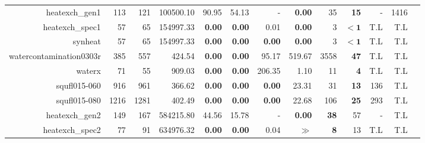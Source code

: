 \begin{landscape}
\begin{table*}[t]
\begin{tabular}{|r|r|r||r||r|r|r|r||r|r|r|r|r|}
                      heatexch\_gen1 &           113 &           121 &                         100500.10 &          90.95 &          54.13 &              - &  \textbf{0.00} &                 35 &        \textbf{15} &                  - &               1416 \\ 
                     heatexch\_spec1 &            57 &            65 &                         154997.33 &  \textbf{0.00} &  \textbf{0.00} &           0.01 &  \textbf{0.00} &                  3 &         $\bm{< 1}$ &                T.L &                T.L \\ 
                             synheat &            57 &            65 &                         154997.33 &  \textbf{0.00} &  \textbf{0.00} &  \textbf{0.00} &  \textbf{0.00} &                  3 &         $\bm{< 1}$ &                T.L &                T.L \\ 
             watercontamination0303r &           385 &           557 &                            424.54 &  \textbf{0.00} &  \textbf{0.00} &          95.17 &         519.67 &               3558 &        \textbf{47} &                T.L &                T.L \\ 
                              waterx &            71 &            55 &                            909.03 &  \textbf{0.00} &  \textbf{0.00} &         206.35 &           1.10 &                 11 &         \textbf{4} &                T.L &                T.L \\ 
                        squfl015-060 &           916 &           961 &                            366.62 &  \textbf{0.00} &  \textbf{0.00} &  \textbf{0.00} &          23.31 &                 31 &        \textbf{13} &                136 &                T.L \\ 
                        squfl015-080 &          1216 &          1281 &                            402.49 &  \textbf{0.00} &  \textbf{0.00} &  \textbf{0.00} &          22.68 &                106 &        \textbf{25} &                293 &                T.L \\ 
                      heatexch\_gen2 &           149 &           167 &                         584215.80 &          44.56 &          15.78 &              - &  \textbf{0.00} &        \textbf{38} &                 57 &                  - &                T.L \\ 
                     heatexch\_spec2 &            77 &            91 &                         634976.32 &  \textbf{0.00} &  \textbf{0.00} &           0.04 &          $\gg$ &         \textbf{8} &                 13 &                T.L &                T.L \\ 

\end{tabular}
\end{table*}
\end{landscape}
